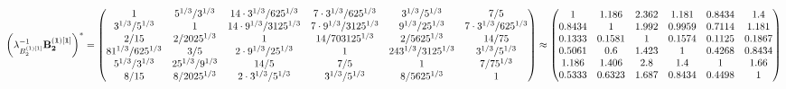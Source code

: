 \documentclass[10pt,a4paper]{article}
\begin{document}
	\[
		\left(\lambda_{B_2^{(1)[1]}}^{-1}\bold{B_2^{(1)[1]}}\right)^* = 
		\begin{pmatrix}
			{1}{} & {{5^ {1 / 3}}} / {{3^ {1 / 3}}} & {{14} \cdot {3^ {1 / 3}}} / {{625^ {1 / 3}}} & {{7} \cdot {3^ {1 / 3}}} / {{625^ {1 / 3}}} & {{3^ {1 / 3}}} / {{5^ {1 / 3}}} & {{7}} / {{5}} \\
			{{3^ {1 / 3}}} / {{5^ {1 / 3}}} & {1}{} & {{14} \cdot {9^ {1 / 3}}} / {{3125^ {1 / 3}}} & {{7} \cdot {9^ {1 / 3}}} / {{3125^ {1 / 3}}} & {{9^ {1 / 3}}} / {{25^ {1 / 3}}} & {{7} \cdot {3^ {1 / 3}}} / {{625^ {1 / 3}}} \\
			{{2}} / {{15}} & {{2}} / {{2025^ {1 / 3}}} & {1}{} & {{14}} / {{703125^ {1 / 3}}} & {{2}} / {{5625^ {1 / 3}}} & {{14}} / {{75}} \\
			{{81^ {1 / 3}}} / {{625^ {1 / 3}}} & {{3}} / {{5}} & {{2} \cdot {9^ {1 / 3}}} / {{25^ {1 / 3}}} & {1}{} & {{243^ {1 / 3}}} / {{3125^ {1 / 3}}} & {{3^ {1 / 3}}} / {{5^ {1 / 3}}} \\
			{{5^ {1 / 3}}} / {{3^ {1 / 3}}} & {{25^ {1 / 3}}} / {{9^ {1 / 3}}} & {{14}} / {{5}} & {{7}} / {{5}} & {1}{} & {{7}} / {{75^ {1 / 3}}} \\
			{{8}} / {{15}} & {{8}} / {{2025^ {1 / 3}}} & {{2} \cdot {3^ {1 / 3}}} / {{5^ {1 / 3}}} & {{3^ {1 / 3}}} / {{5^ {1 / 3}}} & {{8}} / {{5625^ {1 / 3}}} & {1}{} \\
		\end{pmatrix}
		\approx
		\begin{pmatrix}
			1        & 1.186    & 2.362    & 1.181    & 0.8434   & 1.4      \\
			0.8434   & 1        & 1.992    & 0.9959   & 0.7114   & 1.181    \\
			0.1333   & 0.1581   & 1        & 0.1574   & 0.1125   & 0.1867   \\
			0.5061   & 0.6      & 1.423    & 1        & 0.4268   & 0.8434   \\
			1.186    & 1.406    & 2.8      & 1.4      & 1        & 1.66     \\
			0.5333   & 0.6323   & 1.687    & 0.8434   & 0.4498   & 1        \\
		\end{pmatrix}
	\]
\end{document}

